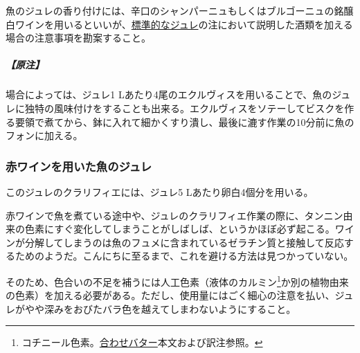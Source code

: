 \begin{recette}
魚のジュレの香り付けには、辛口のシャンパーニュもしくはブルゴーニュの銘醸白ワインを用いるといいが、\protect\hyperlink{gelees-ordinaires}{標準的なジュレ}の注において説明した酒類を加える場合の注意事項を勘案すること。

\hypertarget{nota-gelee-de-poisson-blanche}{%
\subparagraph{【原注】}\label{nota-gelee-de-poisson-blanche}}

場合によっては、ジュレ1
Lあたり4尾のエクルヴィスを用いることで、魚のジュレに独特の風味付けをすることも出来る。エクルヴィスをソテーしてビスクを作る要領で煮てから、鉢に入れて細かくすり潰し、最後に漉す作業の10分前に魚のフォンに加える。

\atoaki{}

\hypertarget{gelee-de-poisson-au-vin-rouge}{%
\subsubsection{赤ワインを用いた魚のジュレ}\label{gelee-de-poisson-au-vin-rouge}}



このジュレのクラリフィエには、ジュレ5 Lあたり卵白4個分を用いる。

赤ワインで魚を煮ている途中や、ジュレのクラリフィエ作業の際に、タンニン由来の色素にすぐ変化してしまうことがしばしば、というかほぼ必ず起こる。ワインが分解してしまうのは魚のフュメに含まれているゼラチン質と接触して反応するためのようだ。こんにちに至るまで、これを避ける方法は見つかっていない。

そのため、色合いの不足を補うには人工色素（液体のカルミン\footnote{コチニール色素。\protect\hyperlink{beurres-composes}{合わせバター}本文および訳注参照。}か別の植物由来の色素）を加える必要がある。ただし、使用量にはごく細心の注意を払い、ジュレがやや深みをおびたバラ色を越えてしまわないようにすること。
\end{recette}
